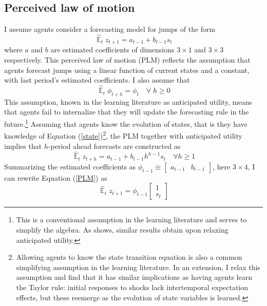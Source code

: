 \documentclass[11pt]{article}
\renewcommand{\[}{\begin{equation}}
\renewcommand{\]}{\end{equation}}
\DeclareMathOperator{\E}{\mathbb{E}}
\begin{document}
\subsection{Perceived law of motion}
I assume agents consider a forecasting model for jumps of the form
\begin{equation}
\hat{\E}_{t}z_{t+1} = a_{t-1} + b_{t-1} s_{t} \label{PLM}  
\end{equation}
where $a$ and $b$ are estimated coefficients of dimensions $3\times1$ and $3\times3$ respectively. This perceived law of motion (PLM) reflects the assumption that agents forecast jumps using a linear function of current states and a constant, with last period's estimated coefficients. I also assume that 
\begin{equation}
\hat{\E}_{t}{\phi_{t+h}} = \phi_{t} \quad \forall \; h\geq0 
\end{equation}
This assumption, known in the learning literature as anticipated utility, means that agents fail to internalize that they will update the forecasting rule in the future.\footnote{This is a conventional assumption in the learning literature and serves to simplify the algebra. As \cite{sargent1999} shows, similar results obtain upon relaxing anticipated utility.} Assuming that agents know the evolution of states, that is they have knowledge of Equation (\ref{state})\footnote{Allowing agents to know the state transition equation is also a common simplifying assumption in the learning literature. In an extension, I relax this assumption and find that it has similar implications as having agents learn the Taylor rule: initial responses to shocks lack intertemporal expectation effects, but these reemerge as the evolution of state variables is learned.}, the PLM together with anticipated utility implies that $h$-period ahead forecasts are constructed as
\begin{equation}
\hat{\E}_t z_{t+h} = a_{t-1} + b_{t-1}h^{h-1}s_t  \quad \forall h\geq 1 \label{PLM_fcst_general}
\end{equation}
Summarizing the estimated coefficients as $\phi_{t-1} \equiv \begin{bmatrix}a_{t-1} & b_{t-1}\end{bmatrix}$, here $3\times 4$, I can rewrite Equation (\ref{PLM}) as 
\begin{equation} 
\hat{\E}_t z_{t+1} = \phi_{t-1}\begin{bmatrix} 1 \\ s_{t} \end{bmatrix} \label{PLMcompact}
\end{equation}
\end{document}
